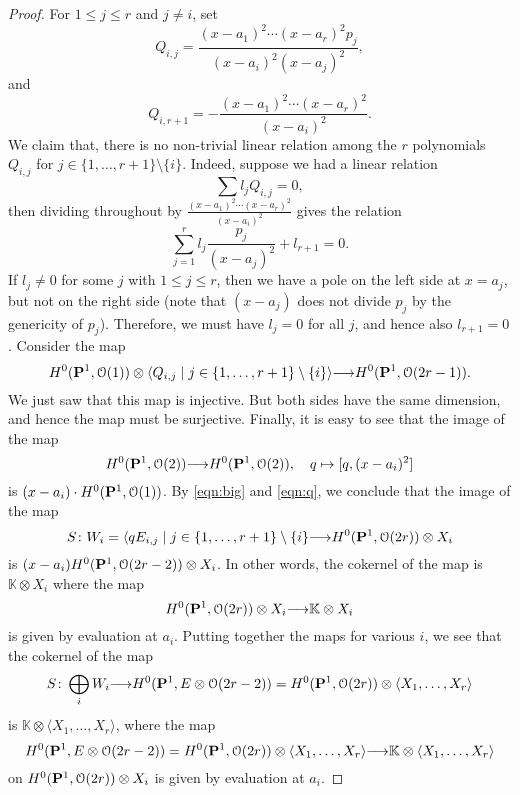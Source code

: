 \documentclass[11pt,reqno]{amsart}
\theoremstyle{plain}
\theoremstyle{definition}
\theoremstyle{remark}
\numberwithin{equation}{section}
\renewcommand{\k}{\mathbb{K}}
\renewcommand{\to}{{\longrightarrow}}
\numberwithin{equation}{section}
\renewcommand{\O}{\mathcal O}
\begin{document}
\begin{proof}
  For $1 \leq j \leq r$ and $j \neq i$, set
  \[
    Q_{i,j} = \frac{(x-a_1)^2 \cdots (x-a_r)^2p_j}{(x-a_i)^2(x-a_j)^2}, 
  \]
  and
  \[
    Q_{i,r+1} = - \frac{(x-a_1)^2 \cdots (x-a_r)^2}{(x-a_i)^2}.
  \]
  We claim that, there is no non-trivial linear relation among the $r$ polynomials $Q_{i,j}$ for $j \in \{1, \dots, r+1\} \setminus \{i\}$.
  Indeed, suppose we had a linear relation
  \[ \sum l_j Q_{i,j} = 0,\]
  then dividing throughout by $\frac{(x-a_1)^2\cdots (x-a_r)^2}{(x-a_i)^2}$ gives the relation
  \[ \sum_{j = 1}^r l_j \frac{p_j}{(x-a_j)^2} + l_{r+1} = 0.\]
  If $l_j \neq 0$ for some $j$ with $1 \leq j \leq r$, then we have a pole on the left side at $x = a_j$, but not on the right side (note that $(x-a_j)$ does not divide $p_j$ by the genericity of $p_j$).
  Therefore, we must have $l_j = 0$ for all $j$, and hence also $l_{r+1} = 0$.
  Consider the map
  \begin{equation}\label{eqn:big}
    H^0(\P^1, \O(1)) \otimes \langle  Q_{i,j} \mid j \in \{1, \dots, r+1\} \setminus \{i\}\rangle \to H^0(\P^1, \O(2r-1)).
  \end{equation}
  We just saw that this map is injective.
  But both sides have the same dimension, and hence the map must be surjective.
  Finally, it is easy to see that the image of the map
  \begin{equation}\label{eqn:q}
    H^0(\P^1, \O(2)) \to H^0(\P^1, \O(2)), \quad q \mapsto [q, (x-a_i)^2]
  \end{equation}
  is $(x-a_i)\cdot H^0(\P^1, \O(1))$.
  By \eqref{eqn:big} and \eqref{eqn:q}, we conclude that the image of the map
  \[ S \from W_i = \langle qE_{i,j} \mid j \in\{1, \dots, r+1\} \setminus \{i\} \to H^0(\P^1, \O(2r)) \otimes X_i\]
  is $(x-a_i)H^0(\P^1, \O(2r-2)) \otimes X_i$.
  In other words, the cokernel of the map is $\k \otimes X_i$ where the map
  \[H^0(\P^1, \O(2r)) \otimes X_i \to \k \otimes X_i \]
  is given by evaluation at $a_i$.
  Putting together the maps for various $i$, we see that the cokernel of the map
  \[ S \from \bigoplus_i W_i \to H^0(\P^1, E \otimes \O(2r-2)) = H^0(\P^1, \O(2r)) \otimes \langle  X_1, \dots, X_r \rangle\]
  is $\k \otimes \langle  X_1, \dots, X_r \rangle$, where the map
  \begin{equation}\label{eqn:partialsur}
    H^0(\P^1, E \otimes \O(2r-2)) = H^0(\P^1, \O(2r)) \otimes \langle  X_1, \dots, X_r \rangle \to \k \otimes \langle  X_1, \dots, X_r \rangle
  \end{equation}
  on $H^0(\P^1, \O(2r)) \otimes X_i$ is given by evaluation at $a_i$.


\end{proof}
\end{document}
